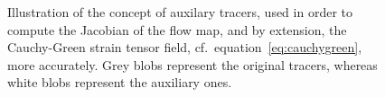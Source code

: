 \begin{figure}[htpb]
    \centering
    \resizebox{0.8\linewidth}{!}{}
    \caption[Illustration of the concept of auxiliary tracers]
    {Illustration of the concept of auxilary tracers, used in order to
    compute the Jacobian of the flow map, and by extension, the Cauchy-Green
    strain tensor field, cf.\ equation~\eqref{eq:cauchygreen}, more accurately.
    Grey blobs represent the original tracers, whereas white blobs represent
    the auxiliary ones.}
    \label{fig:auxiliarygrid}
\end{figure}
